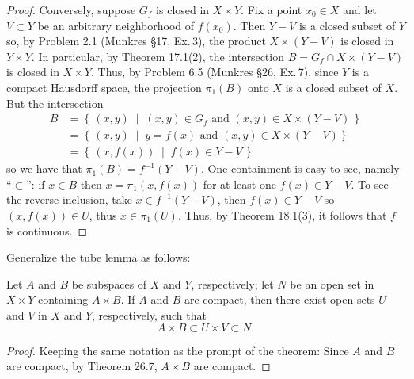 \begin{proof}
Conversely, suppose $G_f$ is closed in $X\times Y$. Fix a point
$x_0\in X$ and let $V\subset Y$ be an arbitrary neighborhood of
$f(x_0)$. Then $Y-V$ is a closed subset of $Y$ so, by Problem 2.1
(Munkres \S17, Ex.\,3), the product $X\times (Y-V)$ is closed in
$Y\times Y$. In particular, by Theorem 17.1(2), the intersection
$B=G_f\cap X\times(Y-V)$ is closed in $X\times Y$. Thus, by Problem
6.5 (Munkres \S26, Ex.\,7), since $Y$ is a compact Hausdorff space,
the projection $\pi_1(B)$ onto $X$ is a closed subset of $X$. But the
intersection
\begin{align*}
B
&=\left\{\,(x,y)\;\middle|\;\text{$(x,y)\in G_f$ and $(x,y)\in X\times
  (Y-V)$}\,\right\}\\
&=\left\{\,(x,y)\;\middle|\;\text{$y=f(x)$ and $(x,y)\in X\times
  (Y-V)$}\right\}\\
&=\left\{\,(x,f(x))\;\middle|\;f(x)\in Y-V\,\right\}
\end{align*}
so we have that $\pi_1(B)=f^{-1}(Y-V)$. One
containment is easy to see, namely ``$\subset$'': if $x\in B$ then
$x=\pi_1(x,f(x))$ for at least one $f(x)\in Y-V$. To see the reverse
inclusion, take $x\in f^{-1}(Y-V)$, then $f(x)\in Y-V$ so $(x,f(x))\in
U$, thus $x\in\pi_1(U)$. Thus, by Theorem 18.1(3), it follows that $f$
is continuous.
\end{proof}
\newpage
\begin{problem}[Munkres \S26, Ex.\,9]
Generalize the tube lemma as follows:
\begin{theorem*}
Let $A$ and $B$ be subspaces of $X$ and $Y$, respectively; let
$N$ be an open set in $X\times Y$ containing $A\times B$. If $A$
and $B$ are compact, then there exist open sets $U$ and $V$ in
$X$ and $Y$, respectively, such that
\[A\times B\subset U\times V\subset N.\]
\end{theorem*}
\end{problem}
\begin{proof}
Keeping the same notation as the prompt of the theorem: Since $A$ and
$B$ are compact, by Theorem 26.7, $A\times B$ are compact.
\end{proof}
